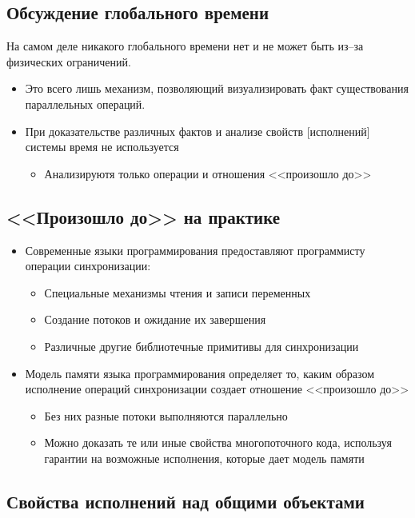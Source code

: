 \documentclass[10pt,a4paper,oneside,titlepage]{article}
\theoremstyle{plain}
\theoremstyle{defenition}
\begin{document}
\subsection{Обсуждение глобального времени}
На самом деле никакого глобального времени нет и не может быть из--за физических ограничений.

\begin{itemize}
	\item Это всего лишь механизм, позволяющий визуализировать факт существования параллельных операций.
	\item При доказательстве различных фактов и анализе свойств [исполнений] системы время не используется
	\begin{itemize}
		\item Анализируютя только операции и отношения <<произошло до>>
	\end{itemize}
\end{itemize}

\subsection{<<Произошло до>> на практике}
\begin{itemize}
	\item Современные языки программирования предоставляют программисту операции синхронизации:
	\begin{itemize}
		\item Специальные механизмы чтения и записи переменных
		\item Создание потоков и ожидание их завершения
		\item Различные другие библиотечные примитивы для синхронизации
	\end{itemize}
    \item Модель памяти языка программирования определяет то, каким образом исполнение операций синхронизации создает отношение <<произошло до>>
    \begin{itemize}
    	\item Без них разные потоки выполняются параллельно
    	\item Можно доказать те или иные свойства многопоточного кода, используя гарантии на возможные исполнения, которые дает модель памяти
    \end{itemize}
\end{itemize}

\subsection{Свойства исполнений над общими объектами}
\end{document}
